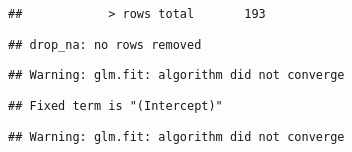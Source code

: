 \documentclass[
]{article}
\begin{document}
\begin{verbatim}
##            > rows total       193
\end{verbatim}

\begin{verbatim}
## drop_na: no rows removed
\end{verbatim}

\begin{verbatim}
## Warning: glm.fit: algorithm did not converge
\end{verbatim}

\begin{verbatim}
## Fixed term is "(Intercept)"
\end{verbatim}

\begin{verbatim}
## Warning: glm.fit: algorithm did not converge
\end{verbatim}
\end{document}
